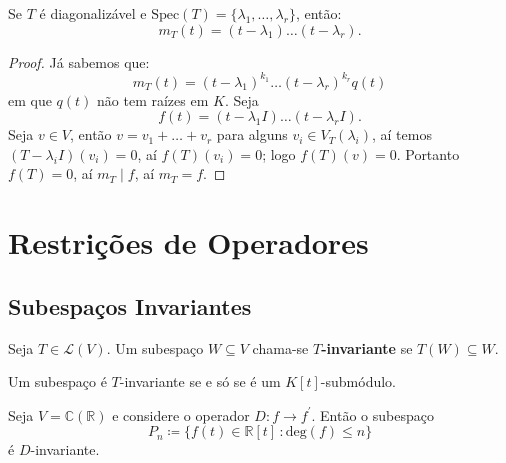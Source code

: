\documentclass[11pt,twoside,a4paper]{book}
\begin{document}
\begin{corolario}\label{diagonal1}
Se $T$ é diagonalizável e $\mathrm{Spec}(T)=\{\lambda_1,\dots,\lambda_r\}$, então:
\[
m_T(t)=(t-\lambda_1)\dots(t-\lambda_r).
\]
\end{corolario}

\begin{proof}
Já sabemos que:
\[
m_T(t)=(t-\lambda_1)^{k_1}\dots(t-\lambda_r)^{k_r}q(t)
\]
em que $q(t)$ não tem raízes em $K$. Seja
\[
f(t)=(t-\lambda_1I)\dots(t-\lambda_rI).
\]
Seja $v\in V$, então $v=v_1+\dots+v_r$ para alguns $v_i\in V_T(\lambda_i)$, aí temos $(T-\lambda_iI)(v_i)=0$, aí $f(T)(v_i)=0$; logo $f(T)(v)=0$. Portanto $f(T)=0$, aí $m_T\mid f$, aí $m_T=f$.
\end{proof}

\section{Restrições de Operadores}

\subsection{Subespaços Invariantes}

\begin{definicao}
Seja $T\in\mathcal{L}(V)$. Um subespaço $W\subseteq V$ chama-se \textbf{$T$-invariante} se $T(W)\subseteq W$.
\end{definicao}

\begin{observacao}
Um subespaço é $T$-invariante se e só se é um $K[t]$-submódulo.
\end{observacao}
\begin{exemplo}
Seja \(V=\mathbb{C}(\mathbb{R})\) e considere o operador \(D\colon f\to
f^\prime\). Então o subespaço\[P_n\coloneqq\{f(t)\in\mathbb{R}[t]\,\colon
\text{deg}(f)\leq n\}\] é \(D\)-invariante. 
\end{exemplo}
\end{document}
